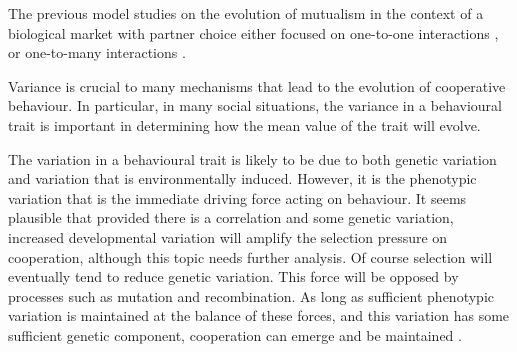 \documentclass[12pt]{article}
\begin{document}
The previous model studies on the evolution of mutualism in the context of a biological market with partner choice either focused on one-to-one interactions \citep{Andre.Baumard2011}, or one-to-many interactions \cite{Foster.Kokko2006}. 


Variance is crucial to many mechanisms that lead to the evolution of cooperative behaviour. In particular, in many social situations, the variance in a behavioural trait is important in determining how the mean value of the trait will evolve.

The variation in a behavioural trait is likely to be due to both genetic variation and variation that is environmentally induced. However, it is the phenotypic variation that is the immediate driving force acting on behaviour. It seems plausible that provided there is a correlation and some genetic variation, increased developmental variation will amplify the selection pressure on cooperation, although this topic needs further analysis. Of course selection will eventually tend to reduce genetic variation. This force will be opposed by processes such as mutation and recombination. As long as sufficient phenotypic variation is maintained at the balance of these forces, and this variation has some sufficient genetic component, cooperation can emerge and be maintained \citep{McNamara.Leimar2010}. 




\end{document}
